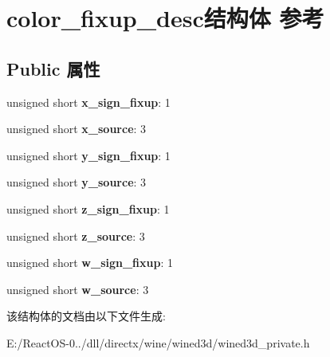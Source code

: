 \hypertarget{structcolor__fixup__desc}{}\section{color\+\_\+fixup\+\_\+desc结构体 参考}
\label{structcolor__fixup__desc}
\subsection*{Public 属性}
\begin{DoxyCompactItemize}
\item 
\mbox{\label{structcolor__fixup__desc_a868a2ce3b291ee5d5f4252db9f70d231}} 
unsigned short {\bfseries x\+\_\+sign\+\_\+fixup}\+: 1
\item 
\mbox{\label{structcolor__fixup__desc_a04037df0addc765190de5ffe2e90c5a4}} 
unsigned short {\bfseries x\+\_\+source}\+: 3
\item 
\mbox{\label{structcolor__fixup__desc_a22bcf28144c368ca8e688d30edf57b59}} 
unsigned short {\bfseries y\+\_\+sign\+\_\+fixup}\+: 1
\item 
\mbox{\label{structcolor__fixup__desc_acbc154923b2d6812ff23431f3dd41a9e}} 
unsigned short {\bfseries y\+\_\+source}\+: 3
\item 
\mbox{\label{structcolor__fixup__desc_ab4c413169751546f354a65bc0513f3c3}} 
unsigned short {\bfseries z\+\_\+sign\+\_\+fixup}\+: 1
\item 
\mbox{\label{structcolor__fixup__desc_adfa43beda13a54db64e2114b5f1f506d}} 
unsigned short {\bfseries z\+\_\+source}\+: 3
\item 
\mbox{\label{structcolor__fixup__desc_ad43259d8fde13b8814b348895ccbbf28}} 
unsigned short {\bfseries w\+\_\+sign\+\_\+fixup}\+: 1
\item 
\mbox{\label{structcolor__fixup__desc_a5de7dda87f2088bb96c33b5d00b94bcc}} 
unsigned short {\bfseries w\+\_\+source}\+: 3
\end{DoxyCompactItemize}


该结构体的文档由以下文件生成\+:\begin{DoxyCompactItemize}
\item 
E\+:/\+React\+O\+S-\/0../dll/directx/wine/wined3d/wined3d\+\_\+private.\+h\end{DoxyCompactItemize}
